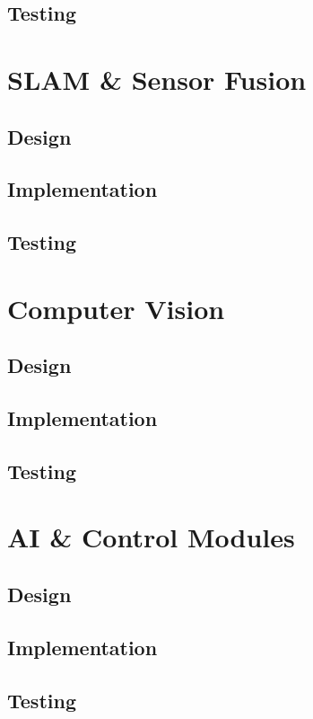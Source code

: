 \subsection{Testing}\label{soft/comms/test}




\section{SLAM \& Sensor Fusion}\label{soft/SLAM}

\subsection{Design}\label{soft/SLAM/design}

\subsection{Implementation}\label{soft/SLAM/impl}

\subsection{Testing}\label{soft/SLAM/test}



\section{Computer Vision}\label{soft/cv}

\subsection{Design}\label{soft/cv/design}

\subsection{Implementation}\label{soft/cv/impl}

\subsection{Testing}\label{soft/cv/test}



\section{AI \& Control Modules}\label{soft/ai}

\subsection{Design}\label{soft/ai/design}

\subsection{Implementation}\label{soft/ai/impl}

\subsection{Testing}\label{soft/ai/test}
